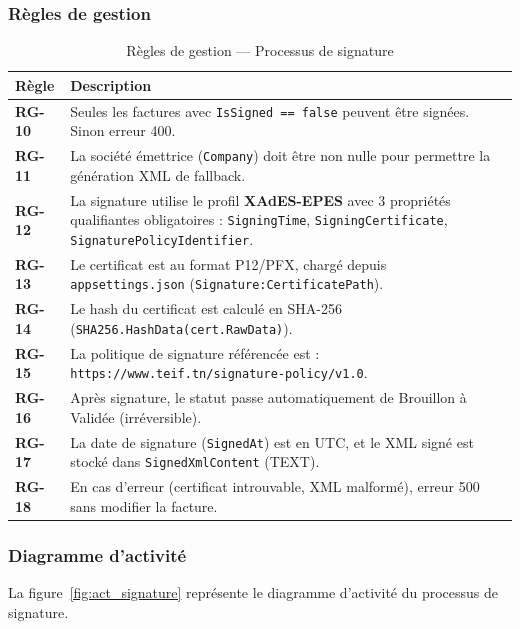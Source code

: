 \documentclass[a4paper,12pt]{report}
\begin{document}
\subsubsection*{Règles de gestion}

\begin{table}[htbp]
\centering
\caption{Règles de gestion — Processus de signature}
\label{tab:rg_sign}
\begin{tabularx}{\textwidth}{|l|X|}
\hline
\textbf{Règle} & \textbf{Description} \\
\hline
\textbf{RG-10} & Seules les factures avec \texttt{IsSigned == false} peuvent être signées. Sinon erreur 400. \\
\hline
\textbf{RG-11} & La société émettrice (\texttt{Company}) doit être non nulle pour permettre la génération XML de fallback. \\
\hline
\textbf{RG-12} & La signature utilise le profil \textbf{XAdES-EPES} avec 3 propriétés qualifiantes obligatoires : \texttt{SigningTime}, \texttt{SigningCertificate}, \texttt{SignaturePolicyIdentifier}. \\
\hline
\textbf{RG-13} & Le certificat est au format P12/PFX, chargé depuis \texttt{appsettings.json} (\texttt{Signature:CertificatePath}). \\
\hline
\textbf{RG-14} & Le hash du certificat est calculé en SHA-256 (\texttt{SHA256.HashData(cert.RawData)}). \\
\hline
\textbf{RG-15} & La politique de signature référencée est : \texttt{https://www.teif.tn/signature-policy/v1.0}. \\
\hline
\textbf{RG-16} & Après signature, le statut passe automatiquement de \og{}Brouillon\fg{} à \og{}Validée\fg{} (irréversible). \\
\hline
\textbf{RG-17} & La date de signature (\texttt{SignedAt}) est en UTC, et le XML signé est stocké dans \texttt{SignedXmlContent} (TEXT). \\
\hline
\textbf{RG-18} & En cas d'erreur (certificat introuvable, XML malformé), erreur 500 sans modifier la facture. \\
\hline
\end{tabularx}
\end{table}

\subsubsection*{Diagramme d'activité}

La figure~\ref{fig:act_signature} représente le diagramme d'activité du processus de signature.
\end{document}
